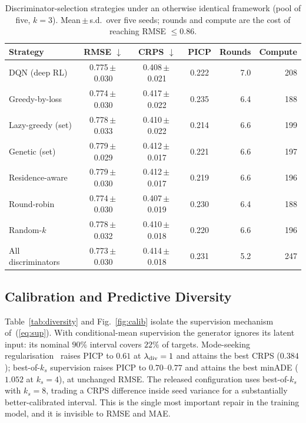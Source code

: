 \documentclass[journal]{IEEEtran}
\begin{document}
\begin{table}[!t]
\centering
\caption{Discriminator-selection strategies under an otherwise identical
framework (pool of five, $k=3$). Mean\,$\pm$\,s.d.\ over five seeds; rounds and
compute are the cost of reaching RMSE $\le0.86$.}
\label{tab:selection}
\footnotesize
\begin{tabular}{lcccrr}
\toprule
Strategy & RMSE $\downarrow$ & CRPS $\downarrow$ & PICP & Rounds & Compute \\
\midrule
DQN (deep RL) & 0.775\,$\pm$\,0.030 & 0.408\,$\pm$\,0.021 & 0.222 & 7.0 & 208 \\
Greedy-by-loss & 0.774\,$\pm$\,0.030 & 0.417\,$\pm$\,0.022 & 0.235 & 6.4 & 188 \\
Lazy-greedy (set) & 0.778\,$\pm$\,0.033 & 0.410\,$\pm$\,0.022 & 0.214 & 6.6 & 199 \\
Genetic (set) & 0.779\,$\pm$\,0.029 & 0.412\,$\pm$\,0.017 & 0.221 & 6.6 & 197 \\
Residence-aware & 0.779\,$\pm$\,0.030 & 0.412\,$\pm$\,0.017 & 0.219 & 6.6 & 196 \\
Round-robin & 0.774\,$\pm$\,0.030 & 0.407\,$\pm$\,0.019 & 0.230 & 6.4 & 188 \\
Random-$k$ & 0.778\,$\pm$\,0.032 & 0.410\,$\pm$\,0.018 & 0.220 & 6.6 & 196 \\
All discriminators & 0.773\,$\pm$\,0.030 & 0.414\,$\pm$\,0.018 & 0.231 & 5.2 & 247 \\
\bottomrule
\end{tabular}
\end{table}

\subsection{Calibration and Predictive Diversity}
\label{sec:calibration}
Table~\ref{tab:diversity} and Fig.~\ref{fig:calib} isolate the supervision
mechanism of~(\ref{eq:sup}). With conditional-mean supervision the generator
ignores its latent input: its nominal $90\%$ interval covers $22\%$ of targets.
Mode-seeking regularisation~\cite{mao2019msgan} raises PICP to $0.61$ at
$\lambda_{\rm div}=1$ and attains the best CRPS ($0.384$); best-of-$k_s$
supervision raises PICP to $0.70$--$0.77$ and attains the best minADE
($1.052$ at $k_s=4$), at unchanged RMSE. The released configuration uses
best-of-$k_s$ with $k_s=8$, trading a CRPS difference inside seed variance for
a substantially better-calibrated interval. This is the single most important
repair in the training model, and it is invisible to RMSE and MAE.
\end{document}
